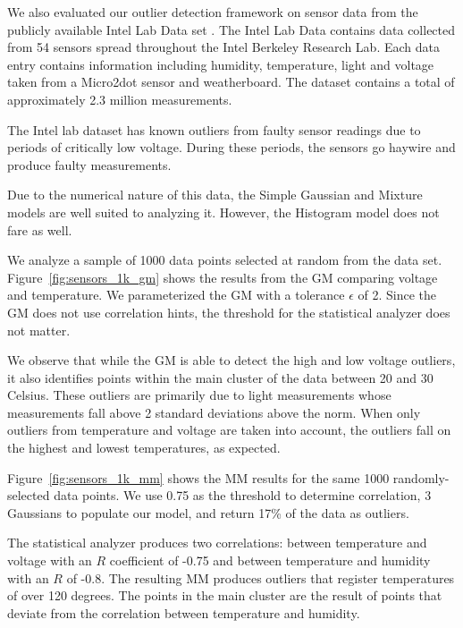 
We also evaluated our outlier detection framework on sensor data from the publicly available Intel Lab Data set \cite{IntelLabData}. The Intel Lab Data contains data collected from 54 sensors spread throughout the Intel Berkeley Research Lab. Each data entry contains information including humidity, temperature, light and voltage taken from a Micro2dot sensor and weatherboard. The dataset contains a total of approximately 2.3 million measurements.

The Intel lab dataset has known outliers from faulty sensor readings due to periods of critically low voltage.
During these periods, the sensors go haywire and produce faulty measurements.

Due to the numerical nature of this data, the Simple Gaussian and Mixture models are well suited to analyzing it. However, the Histogram model does not fare as well.

We analyze a sample of 1000 data points selected at random from the data set. Figure~\ref{fig:sensors_1k_gm} shows the results from the GM comparing voltage and temperature.
We parameterized the GM with a tolerance $\epsilon$ of 2.
Since the GM does not use correlation hints, the threshold for the statistical analyzer does not matter.

We observe that while the GM is able to detect the high and low voltage outliers, it also identifies points within the main cluster of the data between 20 and 30 Celsius.
These outliers are primarily due to light measurements whose measurements fall above 2 standard deviations above the norm.
When only outliers from temperature and voltage are taken into account, the outliers fall on the highest and lowest temperatures, as expected.

Figure~\ref{fig:sensors_1k_mm} shows the MM results for the same 1000 randomly-selected data points.
We use 0.75 as the threshold to determine correlation, 3 Gaussians to populate our model, and return 17\% of the data as outliers.

The statistical analyzer produces two correlations: between temperature and voltage with an $R$ coefficient of -0.75 and between temperature and humidity with an $R$ of -0.8.
The resulting MM produces outliers that register temperatures of over 120 degrees.
The points in the main cluster are the result of points that deviate from the correlation between temperature and humidity.

